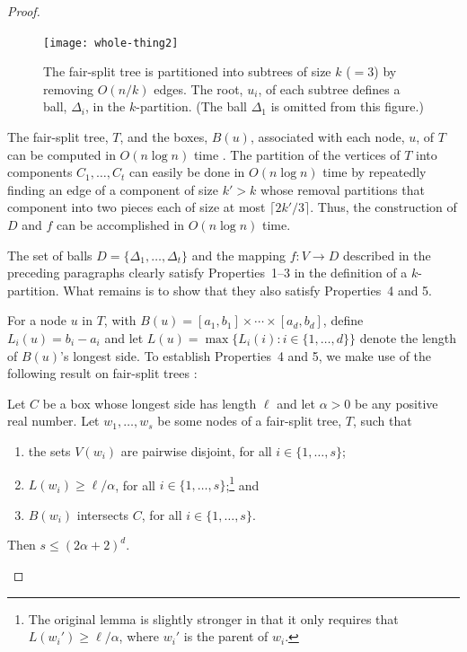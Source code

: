 \documentclass{patmorin}
\begin{document}
\begin{proof}
  \begin{figure}
    \begin{center}
      \texttt{[image: whole-thing2]}
    \end{center}
    \caption{The fair-split tree is partitioned into subtrees of size
    $k$ (${}=3$) by removing $O(n/k)$ edges.  The root, $u_i$, of each subtree
    defines a ball, $\Delta_i$, in the $k$-partition. (The ball $\Delta_1$
    is omitted from this figure.)}
  \end{figure}


  The fair-split tree, $T$, and the boxes, $B(u)$, associated
  with each node, $u$, of $T$ can be computed in $O(n\log n)$ time
  \cite{callahan.kosaraju:decomposition}.  The partition of the vertices
  of $T$ into components $C_1,\ldots,C_t$ can easily be done in $O(n\log
  n)$ time by repeatedly finding an edge of a component of size $k'>k$
  whose removal partitions that component into two pieces each of size
  at most $\lceil 2k'/3\rceil$.  Thus, the construction of $D$ and $f$
  can be accomplished in $O(n\log n)$ time.

  The set of balls $D=\{\Delta_1,\ldots,\Delta_t\}$ and the mapping
  $f:V\to D$ described in the preceding paragraphs clearly satisfy
  Properties~1--3 in the definition of a $k$-partition.  What remains
  is to show that they also satisfy Properties~4 and 5. 

  For a node $u$ in $T$, with $B(u)=[a_1,b_1]\times\cdots\times[a_d,b_d]$,
  define $L_i(u)=b_i-a_i$ and let $L(u)=\max\{L_i(i):i\in\{1,\ldots,d\}\}$
  denote the length of $B(u)$'s longest side.   To establish
  Properties~4 and 5, we make use of the following result on fair-split
  trees \cite[Lemma~9.4.3]{narasimhan.smid:geometric}:

  \begin{lem}
     Let $C$ be a box whose longest side has length $\ell$ and let
     $\alpha >0$ be any positive real number.  Let $w_1,\ldots,w_s$
     be some nodes of a fair-split tree, $T$, such that
     \begin{enumerate}
       \item the sets $V(w_i)$ are pairwise disjoint, for all $i\in\{1,\ldots,s\}$;
       \item $L(w_i)\ge \ell/\alpha$, for all
          $i\in\{1,\ldots,s\}$;\footnote{The original lemma
          \cite[Lemma~9.4.3]{narasimhan.smid:geometric} is slightly
          stronger in that it only requires that $L(w_i')\ge \ell/\alpha$,
          where $w_i'$ is the parent of $w_i$.} and
       \item $B(w_i)$ intersects $C$, for all $i\in\{1,\ldots,s\}$.
     \end{enumerate}
     Then $s\le (2\alpha + 2)^d$.
  \end{lem}


\end{proof}
\end{document}
